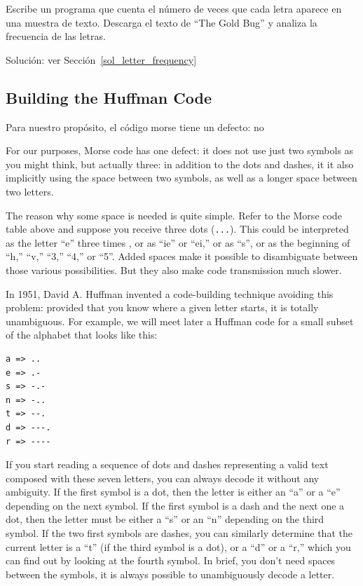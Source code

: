 \begin{exercise}
\label{letter_frequency}
Escribe un programa que cuenta el número de veces que cada letra 
aparece en una muestra de texto. Descarga el texto de ``The Gold Bug'' 
y analiza la frecuencia de las letras.

Solución: ver Sección~\ref{sol_letter_frequency}
\end{exercise}

\subsection{Building the Huffman Code}

Para nuestro propósito, el código morse tiene un defecto: 
no 

For our purposes, Morse code has one defect: it does not 
use just two symbols as you might think, but actually three: 
in addition to the dots and dashes, it it also implicitly 
using the space between two symbols, as well as a longer space 
between two letters.

The reason why some space is needed is quite simple. Refer to the Morse 
code table above and suppose you receive three dots (\verb'...'). 
This could be interpreted as the letter ``e'' three times , or as 
``ie'' or ``ei,'' or as ``s'', or as the beginning of ``h,'' ``v,'' 
``3,'' ``4,'' or ``5''. Added spaces make it possible to disambiguate 
between those various possibilities. But they also make code 
transmission much slower.

In 1951, David A. Huffman invented a code-building technique avoiding 
this problem: provided that you know where a given letter starts, 
it is totally unambiguous. For example, we will meet later a Huffman 
code for a small subset of the alphabet that looks like this:

\begin{verbatim}
a => ..
e => .-
s => -.-
n => -..
t => --.
d => ---.
r => ----
\end{verbatim}

If you start reading a sequence of dots and dashes representing a 
valid text composed with these seven letters, you can always decode 
it without any ambiguity. If the first symbol is a dot, then the letter 
is either an ``a'' or a ``e'' depending on the next symbol. If the 
first symbol is a dash and the next one a dot, then the letter must 
be either a ``s'' or an ``n'' depending on the third symbol. If the 
two first symbols are dashes, you can similarly determine that the 
current letter is a ``t'' (if the third symbol is a dot), or a ``d'' 
or a ``r,'' which you can find out by looking at the fourth symbol. 
In brief, you don't need spaces between the symbols, it is always 
possible to unambiguously decode a letter.

